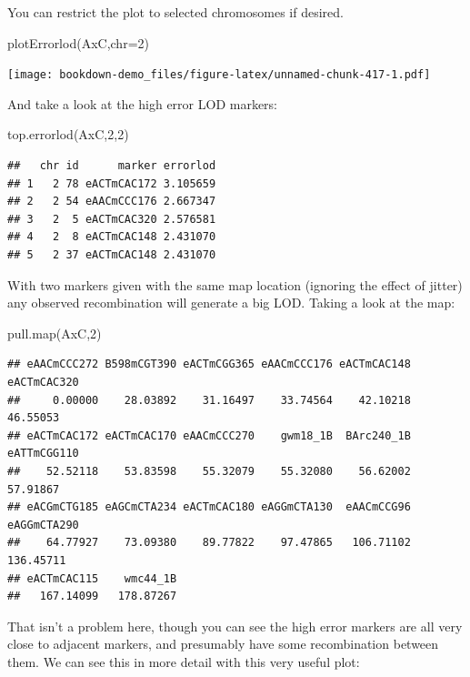 \documentclass[
]{book}
\newenvironment{Shaded}{\begin{snugshade}}{\end{snugshade}}
\newcommand{\AttributeTok}[1]{\textcolor[rgb]{0.77,0.63,0.00}{#1}}
\newcommand{\DecValTok}[1]{\textcolor[rgb]{0.00,0.00,0.81}{#1}}
\newcommand{\FunctionTok}[1]{\textcolor[rgb]{0.00,0.00,0.00}{#1}}
\newcommand{\NormalTok}[1]{#1}
\begin{document}
You can restrict the plot to selected chromosomes if desired.

\begin{Shaded}
\begin{Highlighting}[]
\FunctionTok{plotErrorlod}\NormalTok{(AxC,}\AttributeTok{chr=}\DecValTok{2}\NormalTok{) }
\end{Highlighting}
\end{Shaded}

\texttt{[image: bookdown-demo\_files/figure-latex/unnamed-chunk-417-1.pdf]}

And take a look at the high error LOD markers:

\begin{Shaded}
\begin{Highlighting}[]
\FunctionTok{top.errorlod}\NormalTok{(AxC,}\DecValTok{2}\NormalTok{,}\DecValTok{2}\NormalTok{)}
\end{Highlighting}
\end{Shaded}

\begin{verbatim}
##   chr id      marker errorlod
## 1   2 78 eACTmCAC172 3.105659
## 2   2 54 eAACmCCC176 2.667347
## 3   2  5 eACTmCAC320 2.576581
## 4   2  8 eACTmCAC148 2.431070
## 5   2 37 eACTmCAC148 2.431070
\end{verbatim}

With two markers given with the same map location (ignoring the effect of jitter) any observed recombination will generate a big LOD. Taking a look at the map:

\begin{Shaded}
\begin{Highlighting}[]
\FunctionTok{pull.map}\NormalTok{(AxC,}\DecValTok{2}\NormalTok{) }
\end{Highlighting}
\end{Shaded}

\begin{verbatim}
## eAACmCCC272 B598mCGT390 eACTmCGG365 eAACmCCC176 eACTmCAC148 eACTmCAC320 
##     0.00000    28.03892    31.16497    33.74564    42.10218    46.55053 
## eACTmCAC172 eACTmCAC170 eAACmCCC270    gwm18_1B  BArc240_1B eATTmCGG110 
##    52.52118    53.83598    55.32079    55.32080    56.62002    57.91867 
## eACGmCTG185 eAGCmCTA234 eACTmCAC180 eAGGmCTA130  eAACmCCG96 eAGGmCTA290 
##    64.77927    73.09380    89.77822    97.47865   106.71102   136.45711 
## eACTmCAC115    wmc44_1B 
##   167.14099   178.87267
\end{verbatim}

That isn't a problem here, though you can see the high error markers are all very close to adjacent markers, and presumably have some recombination between them. We can see this in more detail with this very useful plot:
\end{document}
